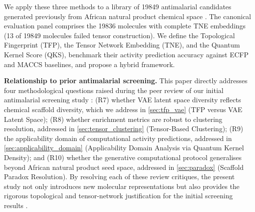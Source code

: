 \documentclass[11pt,a4paper]{article}
\begin{document}
We apply these three methods to a library of \num{19849} antimalarial candidates generated previously from African natural product chemical space \citep{temgoua2026antimalarial}. The canonical evaluation panel comprises the \num{19836} molecules with complete TNE embeddings (13 of \num{19849} molecules failed tensor construction). We define the Topological Fingerprint (TFP), the Tensor Network Embedding (TNE), and the Quantum Kernel Score (QKS), benchmark their activity prediction accuracy against ECFP and MACCS baselines, and propose a hybrid framework.

\noindent\textbf{Relationship to prior antimalarial screening.} This paper directly addresses four methodological questions raised during the peer review of our initial antimalarial screening study \citep{temgoua2026antimalarial}: (R7) whether VAE latent space diversity reflects chemical scaffold diversity, which we address in \cref{sec:tfp_vae} (TFP versus VAE Latent Space); (R8) whether enrichment metrics are robust to clustering resolution, addressed in \cref{sec:tensor_clustering} (Tensor-Based Clustering); (R9) the applicability domain of computational activity predictions, addressed in \cref{sec:applicability_domain} (Applicability Domain Analysis via Quantum Kernel Density); and (R10) whether the generative computational protocol generalises beyond African natural product seed space, addressed in \cref{sec:paradox} (Scaffold Paradox Resolution). By resolving each of these review critiques, the present study not only introduces new molecular representations but also provides the rigorous topological and tensor-network justification for the initial screening results \citep{temgoua2026antimalarial}.
\end{document}
